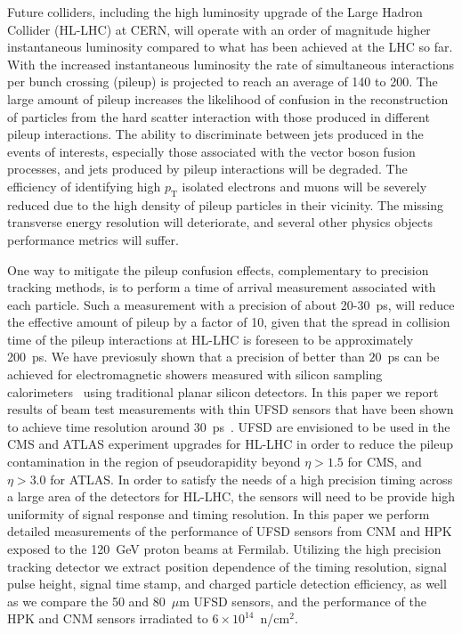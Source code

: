 \documentclass[preprint,1p]{elsarticle}
\begin{document}
Future colliders, including the high luminosity upgrade of the Large Hadron
Collider (HL-LHC) at CERN, will operate with an order of magnitude higher
instantaneous luminosity compared to what has been achieved at the LHC so far.
With the increased instantaneous luminosity the rate of simultaneous
interactions per bunch crossing (pileup) is projected to reach an average of 140
to 200. The large amount of pileup increases the likelihood of confusion in the
reconstruction of particles from the hard scatter interaction with those
produced in different pileup interactions. The ability to discriminate between
jets produced in the events of interests, especially those associated with the
vector boson fusion processes, and jets produced by pileup interactions will be
degraded. The efficiency of identifying high $p_{\mathrm{T}}$ isolated electrons
and muons will be severely reduced due to the high density of pileup particles
in their vicinity. The missing transverse energy resolution will deteriorate, and several
other physics objects performance metrics will suffer.

One way to mitigate the pileup confusion effects, complementary to precision
tracking methods, is to perform a time of arrival measurement associated with
each particle. Such a measurement with a precision of about 20-30~ps, will
reduce the effective amount of pileup by a factor of 10, given that the spread
in collision time of the pileup interactions at HL-LHC is foreseen to be
approximately 200~ps. We have previosuly shown that a precision of better than
$20$~ps can be achieved for electromagnetic showers measured with silicon
sampling calorimeters~\cite{Apresyan201662,Apresyan2017_NSSMIC,AKCHURIN201731}
using traditional planar silicon detectors. In this paper we report results of
beam test measurements with thin UFSD sensors that have been shown to achieve
time resolution around 30~ps~\cite{Cartiglia201783}. UFSD are envisioned to be
used in the CMS and ATLAS experiment upgrades for HL-LHC in order to reduce the
pileup contamination in the region of pseudorapidity beyond $\eta>1.5$ for CMS,
and $\eta>3.0$ for ATLAS. In order to satisfy the needs of a high precision
timing across a large area of the detectors for HL-LHC, the sensors will need to
be provide high uniformity of signal response and timing resolution. In this
paper we perform detailed measurements of the performance of UFSD sensors from
CNM and HPK exposed to the 120~GeV proton beams at Fermilab. Utilizing the high
precision tracking detector we extract position dependence of the timing
resolution, signal pulse height, signal time stamp, and charged particle
detection efficiency, as well as we compare the 50 and 80~$\mu$m UFSD sensors,
and the performance of the HPK and CNM sensors irradiated to $6\times
10^{14}$~n/cm$^2$.
\end{document}
